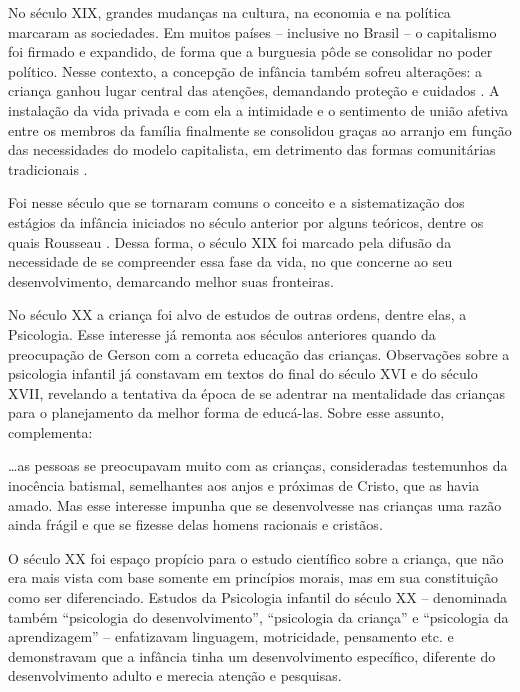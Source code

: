 No século XIX, grandes mudanças na cultura, na economia e na política marcaram as sociedades. Em muitos países -- inclusive no Brasil -- o capitalismo foi firmado e expandido, de forma que a burguesia pôde se consolidar no poder político. Nesse contexto, a concepção de infância também sofreu alterações: a criança ganhou lugar central das atenções, demandando proteção e cuidados . A instalação da vida privada e com ela a intimidade e o sentimento de união afetiva entre os membros da família finalmente se consolidou graças ao arranjo em função das necessidades do modelo capitalista, em detrimento das formas comunitárias tradicionais \cite{MIRANDA1989}.

Foi nesse século que se tornaram comuns o conceito e a sistematização dos estágios da infância iniciados no século anterior por alguns teóricos, dentre os quais Rousseau \cite{GALLATIN1978}. Dessa forma, o século XIX foi marcado pela difusão da necessidade de se compreender essa fase da vida, no que concerne ao seu desenvolvimento, demarcando melhor suas fronteiras. 

No século XX a criança foi alvo de estudos de outras ordens, dentre elas, a Psicologia. Esse interesse já remonta aos séculos anteriores quando da preocupação de Gerson com a correta educação das crianças. Observações sobre a psicologia infantil já constavam em textos do final do século XVI e do século XVII, revelando a tentativa da época de se adentrar na mentalidade das crianças para o planejamento da melhor forma de educá-las. Sobre esse assunto,  complementa:

\begin{citacao}
	\ldots as pessoas se preocupavam muito com as crianças, consideradas testemunhos da inocência batismal, semelhantes aos anjos e próximas de Cristo, que as havia amado. Mas esse interesse impunha que se desenvolvesse nas crianças uma razão ainda frágil e que se fizesse delas homens racionais e cristãos.
\end{citacao}

O século XX foi espaço propício para o estudo científico sobre a criança, que não era mais vista com base somente em princípios morais, mas em sua constituição como ser diferenciado. Estudos da Psicologia infantil do século XX -- denominada também ``psicologia do desenvolvimento'', ``psicologia da criança'' e ``psicologia da aprendizagem'' -- enfatizavam linguagem, motricidade, pensamento etc. \cite[p. 643]{ALMEIDA2004} e demonstravam que a infância tinha um desenvolvimento específico, diferente do desenvolvimento adulto e merecia atenção e pesquisas.

